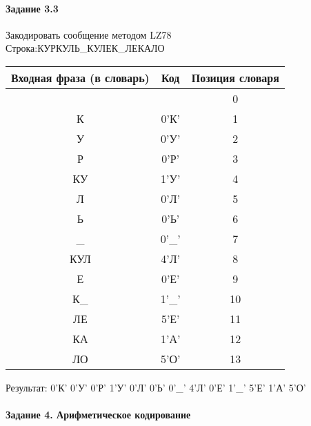 \documentclass[a4paper, 12pt]{article}
\begin{document}
\paragraph{Задание 3.3}

Закодировать сообщение методом LZ78\\
Строка:КУРКУЛЬ\_КУЛЕК\_ЛЕКАЛО\\
\begin{table}[h!]
\centering
\begin{tabular}{|c|c|c|} 
\hline
 Входная фраза (в словарь) & Код & Позиция словаря \\ \hline

 &  & 0 \\ \hline
К & 0'К' & 1 \\ \hline
У & 0'У' & 2 \\ \hline
Р & 0'Р' & 3 \\ \hline
КУ & 1'У' & 4 \\ \hline
Л & 0'Л' & 5 \\ \hline
Ь & 0'Ь' & 6 \\ \hline
\_ & 0'\_' & 7 \\ \hline
КУЛ & 4'Л' & 8 \\ \hline
Е & 0'Е' & 9 \\ \hline
К\_ & 1'\_' & 10 \\ \hline
ЛЕ & 5'Е' & 11 \\ \hline
КА & 1'А' & 12 \\ \hline
ЛО & 5'О' & 13 \\ \hline
\end{tabular}
\end{table}

Результат: 0'К' 0'У' 0'Р' 1'У' 0'Л' 0'Ь' 0'\_' 4'Л' 0'Е' 1'\_' 5'Е' 1'А' 5'О'\\
\pagebreak
\paragraph{Задание 4. Арифметическое кодирование\\}
\end{document}

